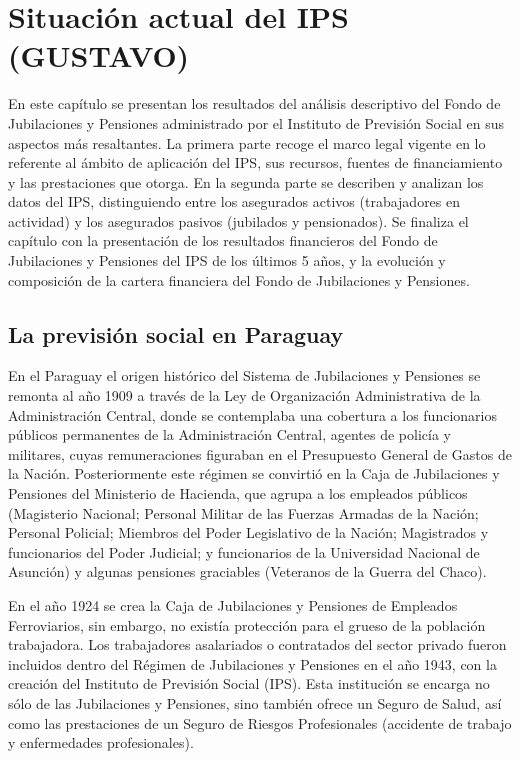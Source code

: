 

\section{Situación actual del IPS (GUSTAVO)}

En este capítulo se presentan los resultados del análisis descriptivo del Fondo de Jubilaciones y Pensiones administrado por el Instituto de Previsión Social en sus aspectos más resaltantes. La primera parte recoge el marco legal vigente en lo referente al ámbito de aplicación del IPS, sus recursos, fuentes de financiamiento y las prestaciones que otorga. En la segunda parte se describen y analizan los datos del IPS, distinguiendo entre los asegurados activos (trabajadores en actividad) y los asegurados pasivos (jubilados y pensionados).  Se finaliza el capítulo con la presentación de los resultados financieros del Fondo de Jubilaciones y Pensiones del IPS de los últimos 5 años, y la evolución y composición de la cartera financiera del Fondo de Jubilaciones y Pensiones.

\subsection{La previsión social en Paraguay}

En el Paraguay el origen histórico del Sistema de Jubilaciones y Pensiones se remonta al año 1909 a través de la Ley de Organización Administrativa de la Administración Central, donde se contemplaba una cobertura a los funcionarios públicos permanentes de la Administración Central, agentes de policía y militares, cuyas remuneraciones figuraban en el Presupuesto General de Gastos de la Nación. Posteriormente este régimen se convirtió en la Caja de Jubilaciones y Pensiones del Ministerio de Hacienda, que agrupa a los empleados públicos (Magisterio Nacional; Personal Militar de las Fuerzas Armadas de la Nación; Personal Policial; Miembros del Poder Legislativo de la Nación; Magistrados y funcionarios del Poder Judicial; y funcionarios de la Universidad Nacional de Asunción) y algunas pensiones graciables (Veteranos de la Guerra del Chaco).

En el año 1924 se crea la Caja de Jubilaciones y Pensiones de Empleados Ferroviarios, sin embargo, no existía protección para el grueso de la población trabajadora. Los trabajadores asalariados o contratados del sector privado fueron incluidos dentro del Régimen de Jubilaciones y Pensiones en el año 1943, con la creación del Instituto de Previsión Social (IPS). Esta institución se encarga no sólo de las Jubilaciones y Pensiones, sino también ofrece un Seguro de Salud, así como las prestaciones de un Seguro de Riesgos Profesionales (accidente de trabajo y enfermedades profesionales).

